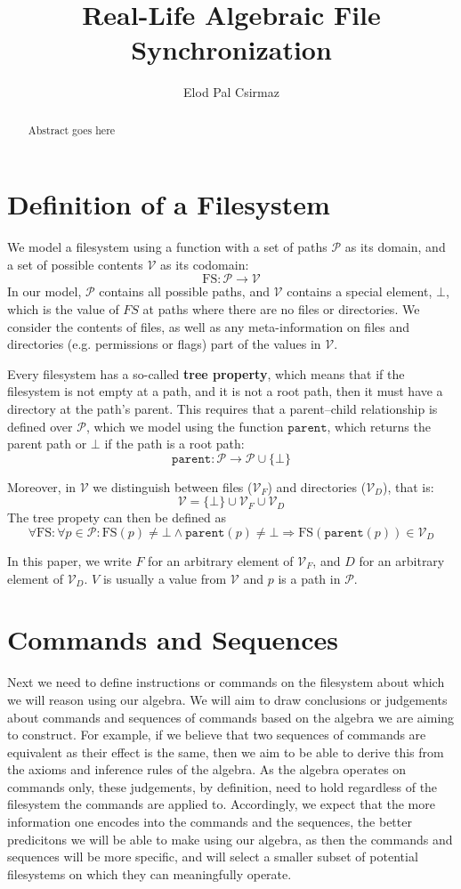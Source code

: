 \documentclass[12pt]{article}
\title{Real-Life Algebraic File Synchronization}
\author{Elod Pal Csirmaz}
\newcommand{\setv}{\mathcal{V}}
\newcommand{\setf}{\mathcal{V}_F}
\newcommand{\setd}{\mathcal{V}_D}
\newcommand{\setp}{\mathcal{P}}
\newcommand{\empt}{\bot}
\newcommand{\parent}{\mathtt{parent}}
\newcommand{\FS}{\mathrm{FS}}
\begin{document}
\begin{abstract}
Abstract goes here
\end{abstract}

\section{Definition of a Filesystem}

We model a filesystem using a function with a set of paths $\setp$ as its domain,
and a set of possible contents $\setv$ as its codomain:
\[ \FS : \setp \rightarrow \setv \] 
In our model, $\setp$ contains all possible paths, and $\setv$ contains a special
element, $\empt$, which is the value of $FS$ at paths where there are no files
or directories.
We consider the contents of files, as well as any meta-information on files
and directories (e.g. permissions or flags) part of the values in $\setv$.

Every filesystem has a so-called \textbf{tree property}, which means that
if the filesystem is not empty at a path, and it is not a root path,
then it must have a directory at the path's parent.
This requires that a parent--child relationship is defined over $\setp$,
which we model using the function $\parent$, which returns the parent path
or $\empt$ if the path is a root path:
\[ \parent : \setp \rightarrow \setp \cup \{\empt\} \]

Moreover, in $\setv$ we distinguish between files ($\setf$) and directories ($\setd$), that is:
\[ \setv = \{\empt\} \cup \setf \cup \setd \]
The tree propety can then be defined as
\[ \forall \FS : \forall p\in\setp : \FS(p) \neq \empt \wedge \parent(p) \neq \empt \Rightarrow \FS(\parent(p)) \in \setd \]


In this paper, we write $F$ for an arbitrary element of $\setf$, and $D$ for an arbitrary element
of $\setd$. $V$ is usually a value from $\setv$ and $p$ is a path in $\setp$.

\section{Commands and Sequences}

Next we need to define instructions or commands on the filesystem about which we will reason
using our algebra.
We will aim to draw conclusions or judgements about commands and sequences of commands
based on the algebra we are aiming to construct.
For example, if we believe that two sequences of commands are equivalent as their effect
is the same, then we aim to be able to derive this from the axioms and inference rules of the
algebra.
As the algebra operates on commands only,
these judgements, by definition, need to hold regardless of the filesystem the commands are applied to.
Accordingly, we expect that the more information one encodes into the commands and the sequences,
the better predicitons we will be able to make using our algebra,
as then the commands and sequences will be more specific, and will select a smaller subset
of potential filesystems on which they can meaningfully operate.
\end{document}
